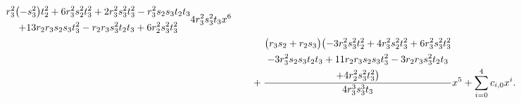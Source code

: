 \begin{align}
{\begin{gathered}
                                                                                                              r_3^2 \bigl( -s_3^2\bigr) t_2^2 +6 r_3^2 s_2^2 t_3^2 +2 r_3^2 s_3^2 t_3^2 -r_3^2 s_2 s_3 t_2 t_3 \\
                                                                                                              +13 r_2 r_3 s_2 s_3 t_3^2 -r_2 r_3 s_3^2 t_2 t_3 +6 r_2^2 s_3^2 t_3^2
                                                                                                          \end{gathered}}{4 r_3^2 s_3^2 t_3}x^{6}\notag \\
                    & \qquad{}+ \frac{\begin{gathered}
                                        \bigl(r_3 s_2 +r_2 s_3\bigr) \bigl( -3 r_3^2 s_3^2 t_2^2 +4 r_3^2 s_2^2 t_3^2 +6 r_3^2 s_3^2 t_3^2 \\
                                        -3 r_3^2 s_2 s_3 t_2 t_3 +11 r_2 r_3 s_2 s_3 t_3^2 -3 r_2 r_3 s_3^2 t_2 t_3 \\
                                        +4 r_2^2 s_3^2 t_3^2\bigr)
                                    \end{gathered}}{4 r_3^3 s_3^3 t_3}x^{5} + \sum_{i=0}^{4}c_{i,0}x^i.
\end{align}
